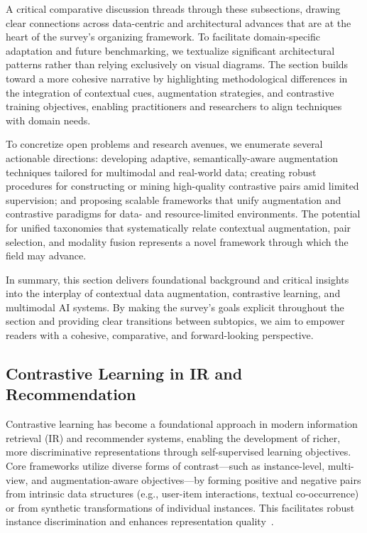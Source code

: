\documentclass[sigconf]{acmart}
\begin{document}
A critical comparative discussion threads through these subsections, drawing clear connections across data-centric and architectural advances that are at the heart of the survey's organizing framework. To facilitate domain-specific adaptation and future benchmarking, we textualize significant architectural patterns rather than relying exclusively on visual diagrams. The section builds toward a more cohesive narrative by highlighting methodological differences in the integration of contextual cues, augmentation strategies, and contrastive training objectives, enabling practitioners and researchers to align techniques with domain needs.

To concretize open problems and research avenues, we enumerate several actionable directions: developing adaptive, semantically-aware augmentation techniques tailored for multimodal and real-world data; creating robust procedures for constructing or mining high-quality contrastive pairs amid limited supervision; and proposing scalable frameworks that unify augmentation and contrastive paradigms for data- and resource-limited environments. The potential for unified taxonomies that systematically relate contextual augmentation, pair selection, and modality fusion represents a novel framework through which the field may advance.

In summary, this section delivers foundational background and critical insights into the interplay of contextual data augmentation, contrastive learning, and multimodal AI systems. By making the survey's goals explicit throughout the section and providing clear transitions between subtopics, we aim to empower readers with a cohesive, comparative, and forward-looking perspective.

\subsection{Contrastive Learning in IR and Recommendation}

Contrastive learning has become a foundational approach in modern information retrieval (IR) and recommender systems, enabling the development of richer, more discriminative representations through self-supervised learning objectives. Core frameworks utilize diverse forms of contrast—such as instance-level, multi-view, and augmentation-aware objectives—by forming positive and negative pairs from intrinsic data structures (e.g., user-item interactions, textual co-occurrence) or from synthetic transformations of individual instances. This facilitates robust instance discrimination and enhances representation quality~\cite{ref12,ref14,ref15,ref16,ref18,ref19,ref20,ref21,ref23,ref24,ref25,ref26,ref27,ref30,ref32,ref33,ref36,ref37,ref38,ref43,ref45,ref54,ref55,ref62}. 
\end{document}
